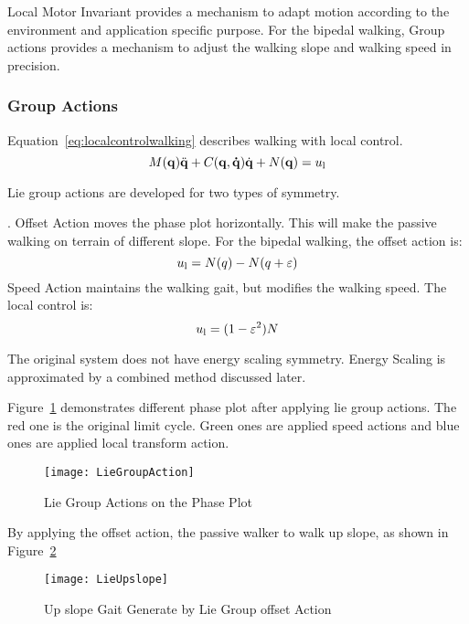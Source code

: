Local Motor Invariant provides a mechanism to adapt motion according to the environment and application specific purpose. 
For the bipedal walking, Group actions provides a mechanism to adjust the walking slope and walking speed in precision.




\subsubsection{Group Actions}

Equation~\ref{eq:localcontrolwalking} describes walking with local control.
\begin{equation}
\label{eq:localcontrolwalking}
M(\mathbf{q}) \ddot{\mathbf{q}} + C(\mathbf{q,\dot{q}})\dot{\mathbf{q}} + N(\mathbf{q}) = u_{\mathrm{l}}
\end{equation}




Lie group actions are developed for two types of symmetry.
\begin{itemize}

.
Offset Action moves the phase plot horizontally.
This will make the passive walking on terrain of different slope.
For the bipedal walking, the offset action is:
\[
u_{\mathrm{l}}=N(q)-N(q+\varepsilon)
\]
Speed Action maintains the walking gait, but modifies the walking speed.
The local control is:
\[  
u_{\mathrm{l}}=(1-\varepsilon^2)N
\]
\end{itemize}

The original system does not have energy scaling symmetry.
Energy Scaling is approximated by a combined method discussed later.

Figure~\ref{fig:walkliegroupphase} demonstrates different phase plot after applying lie group actions.
The red one is the original limit cycle.
Green ones are applied speed actions and blue ones are applied local transform action.


\begin{figure}[!htbp]
  \begin{center}
     \texttt{[image: LieGroupAction]}
    \caption{Lie Group Actions on the Phase Plot}
    \label{fig:walkliegroupphase}
\end{center}
\end{figure}


By applying the offset action,   the passive walker to walk up slope, as shown in Figure~\ref{fig:liegroupupslope}
\begin{figure}[!htbp]
  \begin{center}
      \texttt{[image: LieUpslope]}
    \caption{Up slope Gait Generate by Lie Group offset Action}
    \label{fig:liegroupupslope}
\end{center}
\end{figure}

